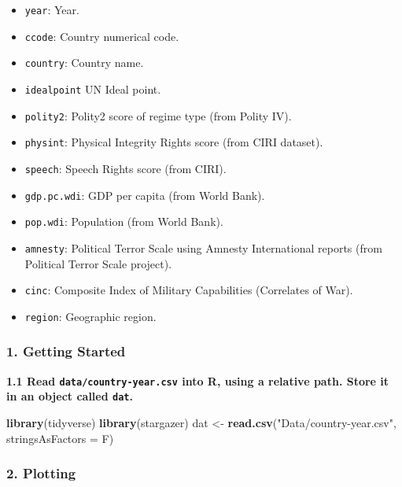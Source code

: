 \documentclass[]{book}
\newenvironment{Shaded}{\begin{snugshade}}{\end{snugshade}}
\newcommand{\DataTypeTok}[1]{\textcolor[rgb]{0.13,0.29,0.53}{#1}}
\newcommand{\KeywordTok}[1]{\textcolor[rgb]{0.13,0.29,0.53}{\textbf{#1}}}
\newcommand{\NormalTok}[1]{#1}
\newcommand{\StringTok}[1]{\textcolor[rgb]{0.31,0.60,0.02}{#1}}
\providecommand{\tightlist}{%
  \setlength{\itemsep}{0pt}\setlength{\parskip}{0pt}}
\begin{document}
\begin{itemize}
\tightlist
\item
  \texttt{year}: Year.
\item
  \texttt{ccode}: Country numerical code.
\item
  \texttt{country}: Country name.
\item
  \texttt{idealpoint} UN Ideal point.
\item
  \texttt{polity2}: Polity2 score of regime type (from Polity IV).
\item
  \texttt{physint}: Physical Integrity Rights score (from CIRI dataset).
\item
  \texttt{speech}: Speech Rights score (from CIRI).
\item
  \texttt{gdp.pc.wdi}: GDP per capita (from World Bank).
\item
  \texttt{pop.wdi}: Population (from World Bank).
\item
  \texttt{amnesty}: Political Terror Scale using Amnesty International reports (from Political Terror Scale project).
\item
  \texttt{cinc}: Composite Index of Military Capabilities (Correlates of War).
\item
  \texttt{region}: Geographic region.
\end{itemize}

\hypertarget{getting-started}{%
\subsubsection*{1. Getting Started}\label{getting-started}}

\textbf{1.1 Read \texttt{data/country-year.csv} into R, using a relative path. Store it in an object called \texttt{dat}.}

\begin{Shaded}
\begin{Highlighting}[]
\KeywordTok{library}\NormalTok{(tidyverse)}
\KeywordTok{library}\NormalTok{(stargazer)}
\NormalTok{dat <-}\StringTok{ }\KeywordTok{read.csv}\NormalTok{(}\StringTok{"Data/country-year.csv"}\NormalTok{, }\DataTypeTok{stringsAsFactors =}\NormalTok{ F)}
\end{Highlighting}
\end{Shaded}

\hypertarget{plotting-1}{%
\subsubsection*{2. Plotting}\label{plotting-1}}
\end{document}
